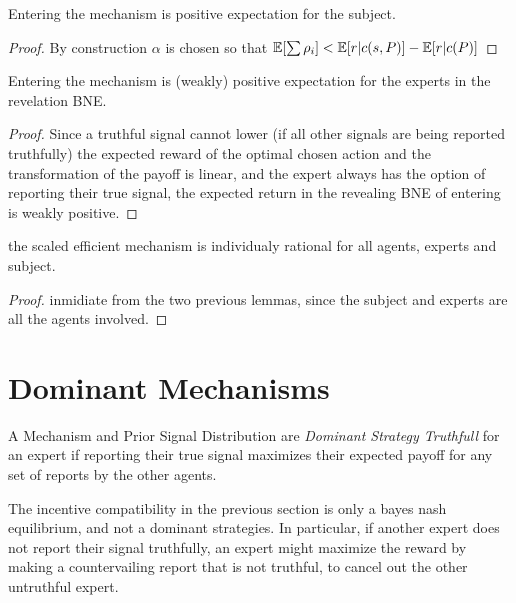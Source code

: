 \begin{lem}
	Entering the mechanism is positive expectation for the subject.
\end{lem}

\begin{proof}
  By construction $\alpha$ is chosen so that $\operatorname*{\mathbb E}[\sum \rho_i] < \operatorname*{\mathbb E}[r|c(s,P)] - \operatorname*{\mathbb E}[r|c(P)]$
\end{proof}


\begin{lem}
	Entering the mechanism is (weakly) positive expectation for the experts in the revelation BNE.
\end{lem}

\begin{proof}
Since a truthful signal cannot lower (if all other signals are being reported truthfully) the expected reward of the optimal chosen action and the transformation of the payoff is linear, and the expert always has the option of reporting their true signal, the expected return in the revealing BNE of entering is weakly positive.
\end{proof}




\begin{thm}
	the scaled efficient mechanism is individualy rational for all agents, experts and subject.
\end{thm}

\begin{proof}
inmidiate from the two previous lemmas, since the subject and experts are all the agents involved.
\end{proof}




\section{Dominant Mechanisms}

\begin{defn}
	A Mechanism and Prior Signal Distribution are \emph{Dominant Strategy Truthfull} for an expert if reporting their true signal maximizes their expected payoff for any set of reports by the other agents. 
\end{defn}

The incentive compatibility in the previous section is only a bayes nash equilibrium, and not a dominant strategies. In particular, if another expert does not report their signal truthfully, an expert might maximize the reward by making a countervailing report that is not truthful, to cancel out the other untruthful expert. 


